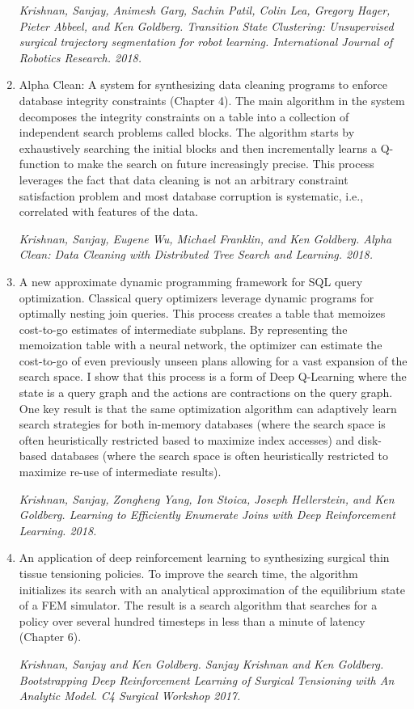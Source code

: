 \begin{enumerate}
    \emph{Krishnan, Sanjay, Animesh Garg, Sachin Patil, Colin Lea, Gregory Hager, Pieter Abbeel, and Ken Goldberg. Transition State Clustering: Unsupervised surgical trajectory segmentation for robot learning. International Journal of Robotics Research. 2018.}

    \item Alpha Clean: A system for synthesizing data cleaning programs to enforce database integrity constraints (Chapter 4). The main algorithm in the system decomposes the integrity constraints on a table into a collection of independent search problems called blocks. The algorithm starts by exhaustively searching the initial blocks and then incrementally learns a Q-function to make the search on future increasingly precise. This process leverages the fact that data cleaning is not an arbitrary constraint satisfaction problem and most database corruption is systematic, i.e., correlated with features of the data. 

     \emph{Krishnan, Sanjay, Eugene Wu, Michael Franklin, and Ken Goldberg. Alpha Clean: Data Cleaning with Distributed Tree Search and Learning. 2018.}

    \item A new approximate dynamic programming framework for SQL query optimization. Classical query optimizers leverage dynamic programs for optimally nesting join queries. This process creates a table that memoizes cost-to-go estimates of intermediate subplans. By representing the memoization table with a neural network, the optimizer can estimate the cost-to-go of even previously unseen plans allowing for a vast expansion of the search space. I show that this process is a form of Deep Q-Learning where the state is a query graph and the actions are contractions on the query graph. One key result is that the same optimization algorithm can adaptively learn search strategies for both in-memory databases (where the search space is often heuristically restricted based to maximize index accesses) and disk-based databases (where the search space is often heuristically restricted to maximize re-use of intermediate results).

    \emph{Krishnan, Sanjay, Zongheng Yang, Ion Stoica, Joseph Hellerstein, and Ken Goldberg. Learning to Efficiently Enumerate Joins with Deep Reinforcement Learning. 2018.}
    
    \item An application of deep reinforcement learning to synthesizing surgical thin tissue tensioning policies. To improve the search time, the algorithm initializes its search with an analytical approximation of the equilibrium state of a FEM simulator. The result is a search algorithm that searches for a policy over several hundred timesteps in less than a minute of latency (Chapter 6). 

     \emph{Krishnan, Sanjay and Ken Goldberg. Sanjay Krishnan and Ken Goldberg. Bootstrapping Deep Reinforcement Learning of Surgical Tensioning with An Analytic Model. C4 Surgical Workshop 2017.}
    
\end{enumerate}





